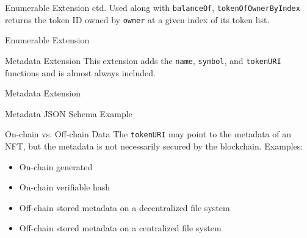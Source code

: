 \documentclass[handout]{beamer}
\begin{document}
\begin{frame}{Enumerable Extension ctd.}
	Used along with \texttt{balanceOf}, \texttt{tokenOfOwnerByIndex} returns the token ID owned by \texttt{owner} at a given index of its token list.\vspace{0.5em}
 
	\begin{samplecode}{Enumerable Extension}
		
	\end{samplecode}

\end{frame}

\begin{frame}{Metadata Extension}
	This extension adds the \texttt{name}, \texttt{symbol}, and \texttt{tokenURI} functions and is almost always included.
\vspace{0.5em}
	\begin{samplecode}{Metadata Extension}
		
	\end{samplecode}
\vspace{0.5em}
\end{frame}

\begin{frame}{Metadata JSON Schema Example}
%		
\end{frame}

\begin{frame}{On-chain vs. Off-chain Data}
	The \texttt{tokenURI} may point to the metadata of an NFT, but the metadata is not necessarily secured by the blockchain. Examples:\\

	\begin{itemize}
		\item<2-> On-chain generated
		\item<3-> On-chain verifiable hash
		\item<4-> Off-chain stored metadata on a decentralized file system
		\item<5-> Off-chain stored metadata on a centralized file system
	\end{itemize}
\end{frame}
\end{document}
